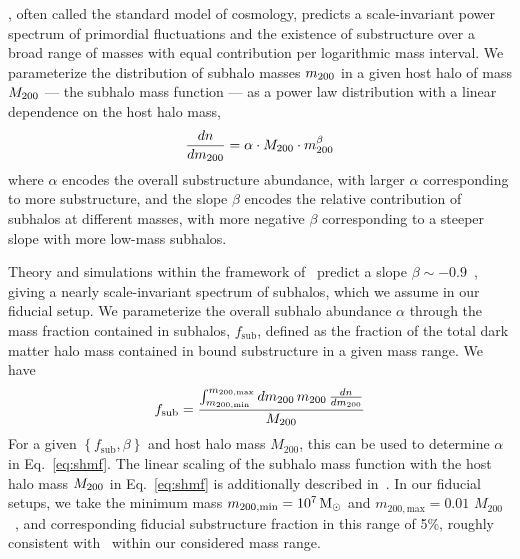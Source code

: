 \documentclass[twocolumn]{aastex62}
\begin{document}
 \lcdm, often called the standard model of cosmology, predicts a scale-invariant power spectrum of primordial fluctuations and the existence of substructure over a broad range of masses with equal contribution per logarithmic mass interval. We parameterize the distribution of subhalo masses $m_{200}$ in a given host halo of mass $M_{200}$ --- the subhalo mass function --- as a power law distribution with a linear dependence on the host halo mass,
\begin{equation}
\frac{dn}{d\mtwo} = \alpha \cdot M_\mathrm{200}\cdot\mtwo^{\beta}
\label{eq:shmf}
\end{equation}
where $\alpha$ encodes the overall substructure abundance, with larger $\alpha$ corresponding to more substructure, and the slope $\beta$ encodes the relative contribution of subhalos at different masses, with more negative $\beta$ corresponding to a steeper slope with more low-mass subhalos. %

Theory and simulations within the framework of \lcdm~predict a slope $\beta\sim-0.9$~\citep{0809.0898,0802.2265}, giving a nearly scale-invariant spectrum of subhalos, which we assume in our fiducial setup.
We parameterize the overall subhalo abundance $\alpha$ through the mass fraction contained in subhalos, $f_\mathrm{sub}$, defined as the fraction of the total dark matter halo mass contained in bound substructure in a given mass range. We have
\begin{equation}
f_\mathrm{sub} = \frac{\int_{m_\mathrm{200, min}}^{m_\mathrm{200, max}}d\mtwo\,\mtwo\,\frac{dn}{d\mtwo}}{M_\mathrm{200}}
\end{equation}
For a given $\left\{f_\mathrm{sub},\beta\right\}$ and host halo mass $M_\mathrm{200}$, this can be used to determine $\alpha$ in Eq.~\ref{eq:shmf}. The linear scaling of the subhalo mass function with the host halo mass $M_{200}$ in Eq.~\ref{eq:shmf} is additionally described in~\citet{2016MNRAS.457.1208H,2017MNRAS.469.1997D}. In our fiducial setups, we take the minimum mass $m_\mathrm{200, min} = 10^7\,\textrm{M}_\odot$ and $m_\mathrm{200, max} = 0.01\,\,M_\mathrm{200}$~\citep{2017MNRAS.469.1997D,2018PhRvD..97l3002H}, and corresponding fiducial substructure fraction in this range of 5\%, roughly consistent with~\citet{2018PhRvD..97l3002H,2019arXiv190504182H,2002ApJ...572...25D} within our considered mass range.
\end{document}
